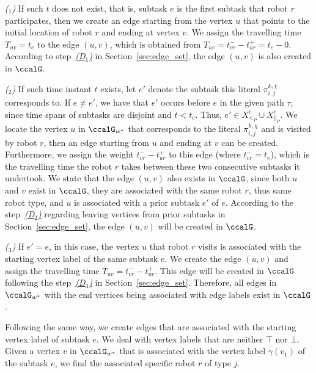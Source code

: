 \documentclass[Afour,sageh,times]{sagej}
\newcounter{mycounter}
\renewcommand{\ap}[3]{\mathcal{\pi}_{{#1},{#2}}^{#3}}
\begin{document}
{{{\it ($_1$)} If such $t$ does not exist, that is, subtask $e$ is the first subtask that robot $r$ participates, then we create an edge starting from the vertex $u$ that points to the initial location of robot $r$ and ending at vertex $v$. We assign the travelling time $T_{uv}=t_e$ to the edge $(u,v)$, which is obtained from  $T_{uv} = t_{vr}^- - t_{ur}^+ = t_e - 0$.
According to step~\hyperref[sec:a]{\it (D$_1$)} in Section~\ref{sec:edge_set}, the edge $(u,v)$ is  also  created in $\ccalG$.

{\it ($_2$)} If such time instant $t$ exists, let $e'$ denote the subtask this literal $\ap{i}{j}{k,\chi}$ corresponds to. If $e\neq e'$, we have that $e'$ occurs before $e$ in the given path $\tau$, since time spans of subtasks are disjoint and $t < t_e$. Thus, $e' \in X_{<_P}^{e} \cup X_{\|_P}^e$. We locate the vertex $u$ in $\ccalG_{w^*}$ that corresponds to the literal $\ap{i}{j}{k,\chi}$ and is visited by robot $r$, then an edge starting from $u$ and ending at $v$ can be created. Furthermore, we assign the weight $t_{vr}^- - t_{ur}^+$ to this edge (where $t_{vr}^-=t_e$), which is the travelling time the robot $r$ takes between these two consecutive subtasks it undertook. We state that the edge $(u, v)$ also exists in $\ccalG$, since both $u$ and $v$ exist in $\ccalG$, they are associated with the same robot $r$, thus  same robot type, and $u$ is associated with a prior subtask $e'$ of $e$. According to the step~\hyperref[sec:b]{\it (D$_2$)} regarding leaving vertices from prior subtasks in Section~\ref{sec:edge_set}, the edge $(u,v)$ will be created in $\ccalG$.

{\it ($_3$)} If $e'=e$, in this case, the vertex $u$ that robot $r$ visits is associated with the starting vertex label of the same subtask  $e$. We create the edge $(u,v)$ and assign the travelling time  $T_{uv} = t_{vr}^- - t_{ur}^+$. This edge will be created in $\ccalG$ following the step~\hyperref[sec:c]{\it (D$_3$)} in Section~\ref{sec:edge_set}. Therefore, all edges in $\ccalG_{w^*}$ with the end vertices being associated with edge labels exist in $\ccalG$.


Following the same way, we create edges that are associated with the starting vertex label of subtask $e$. We deal with vertex labels that are neither $\top$ nor $\bot$. Given a vertex $v$ in $\ccalG_{w^*}$ that is associated with the vertex label $\gamma(v_1)$ of the subtask $e$,  we find  the associated specific  robot $r$ of type $j$.

}}
\end{document}
